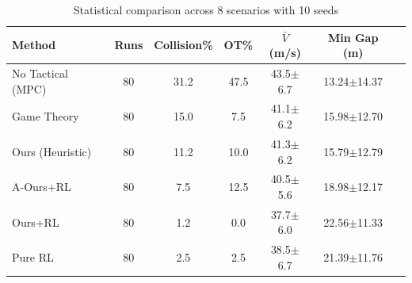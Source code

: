 \begin{table}[htbp]
\centering
\caption{Statistical comparison across 8 scenarios with 10 seeds}
\label{tab:rl_comparison}
\begin{tabular}{lcccccc}
\toprule
Method & Runs & Collision\% & OT\% & $\bar{V}$ (m/s) & Min Gap (m) \\
\midrule
No Tactical (MPC) & 80 & 31.2 & 47.5 & 43.5$\pm$6.7 & 13.24$\pm$14.37 \\
Game Theory & 80 & 15.0 & 7.5 & 41.1$\pm$6.2 & 15.98$\pm$12.70 \\
Ours (Heuristic) & 80 & 11.2 & 10.0 & 41.3$\pm$6.2 & 15.79$\pm$12.79 \\
A-Ours+RL & 80 & 7.5 & 12.5 & 40.5$\pm$5.6 & 18.98$\pm$12.17 \\
Ours+RL & 80 & 1.2 & 0.0 & 37.7$\pm$6.0 & 22.56$\pm$11.33 \\
Pure RL & 80 & 2.5 & 2.5 & 38.5$\pm$6.7 & 21.39$\pm$11.76 \\
\bottomrule
\end{tabular}
\end{table}